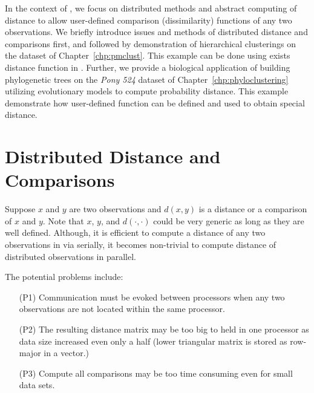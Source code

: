 In the context of \pbdR,
we focus on distributed methods and abstract
computing of distance to allow user-defined comparison (dissimilarity)
functions of any two observations.
We briefly introduce issues and methods of distributed distance and
comparisons first,
and followed by demonstration of hierarchical clusterings on the
dataset of Chapter~\ref{chp:pmclust}. This example can be done using
exists distance function in . Further, we provide a biological
application of building phylogenetic trees on the
{\it Pony 524} dataset
of Chapter~\ref{chp:phyloclustering} utilizing
evolutionary models to compute probability distance.
This example demonstrate how user-defined function can be defined and used
to obtain special distance.



\section{Distributed Distance and Comparisons}

Suppose $x$ and $y$ are two observations and $d(x, y)$ is a distance or
a comparison of $x$ and $y$.
Note that $x$, $y$, and $d(\cdot, \cdot)$ could be very generic as long as
they are well defined.
Although, it is efficient to compute a distance of any two observations
in  via 
serially, it becomes non-trivial to
compute distance of distributed observations in parallel.

The potential problems include:
\begin{itemize}
\item[(P1)]
      Communication must be evoked between processors when any two observations
      are not located within the same processor.
\item[(P2)]
      The resulting distance matrix may be too big
      to held in one processor as data size increased even only a half (lower
      triangular matrix is stored as row-major in a vector.)
\item[(P3)]
      Compute all comparisons may be too time consuming even for small data
      sets. 
\end{itemize}

